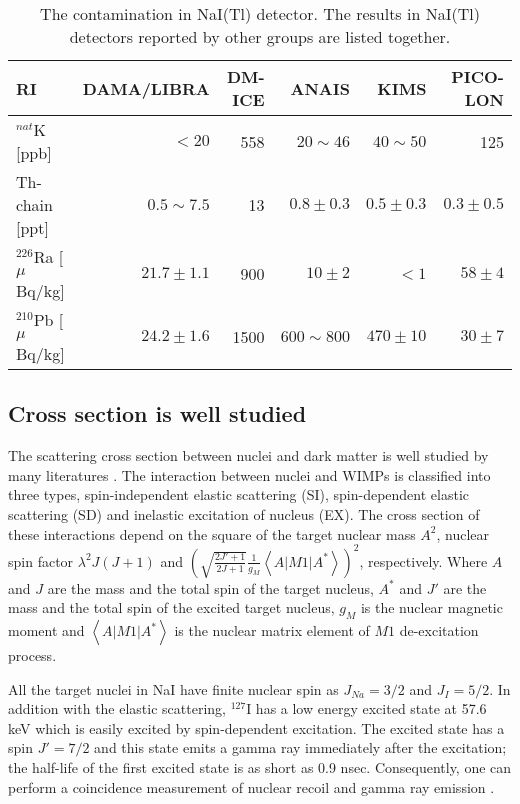 \documentclass{jpsj-suppl} %
\begin{document}
\begin{table}[htb]
\centering
\caption{The contamination in NaI(Tl) detector. The results in NaI(Tl) detectors reported 
by other groups are listed together.}
\label{tb:contami}
\begin{tabular}{l|rrrrr} \hline
RI & DAMA/LIBRA\cite{DAMA_NIM} &DM-ICE\cite{DM-ICE} & ANAIS \cite{ANAIS} & KIMS \cite{KIMS}& PICO-LON \\
\hline
$^{nat}$K [ppb] & $<20$ & 558 &$20\sim46$ & $40\sim50$ & 125 \\
Th-chain [ppt] & $0.5\sim7.5$ & 13 & $0.8\pm0.3$ & $0.5\pm0.3$ & $0.3\pm0.5$ \\
$^{226}$Ra [$\mu$Bq/kg] & $21.7\pm1.1$ & 900& $10\pm2$ & $<1$ & $58\pm4$ \\
$^{210}$Pb [$\mu$Bq/kg] & $24.2\pm1.6$ & 1500& $600\sim800$ & $470\pm10$ & $30\pm7$ \\ \hline
\end{tabular}
\end{table} 

\subsection{Cross section is well studied} 
The scattering cross section between 
nuclei and dark matter is well studied by many literatures \cite{Ressell, Ellis}.
The interaction between nuclei and WIMPs is classified into three types, 
spin-independent elastic scattering (SI), spin-dependent elastic scattering (SD) and 
inelastic excitation of nucleus (EX).
The cross section of these interactions depend on the square of the target nuclear 
mass $A^{2}$, nuclear spin factor $\lambda^{2}J(J+1)$ and $\left(
\sqrt{\frac{2J'+1}{2J+1}}\frac{1}{g_{M}}\left<A\left|M1\right|A^{*}\right>\right)^{2}$, 
respectively.
Where $A$ and $J$ are the mass and the total spin of the target nucleus, 
$A^{*}$ and $J'$ are the mass and the total spin of the excited target nucleus, 
 $g_{M}$ is the nuclear magnetic moment and $\left<A\left|M1\right|A^{*}\right>$ is 
the nuclear matrix element of $M1$ de-excitation process.

All the target nuclei in NaI have finite nuclear spin as $J_{Na}=3/2$ and $J_{I}=5/2$.
In addition with the elastic scattering, $^{127}$I has a low energy excited state at 57.6 keV 
which is easily excited by spin-dependent excitation.
The excited state has a spin $J'=7/2$ and this state emits a gamma ray immediately 
after the excitation; the half-life of the first excited state is as short as 0.9 nsec\cite{TOI}.
Consequently, one can perform a coincidence measurement of nuclear recoil and gamma ray
 emission \cite{Fushimi_PICO-LON}.
\end{document}
